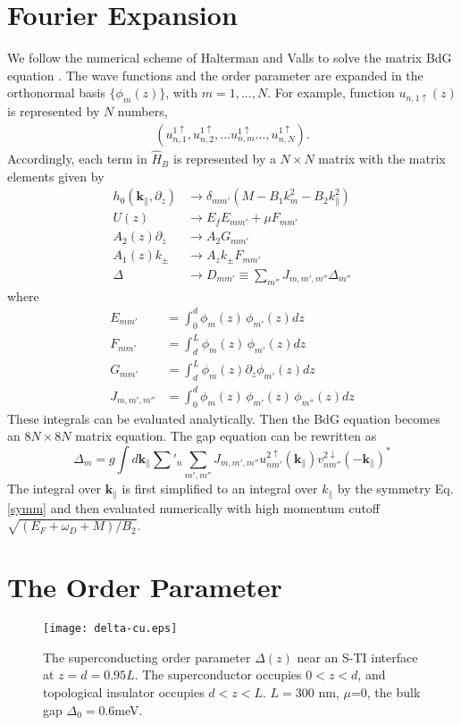 \documentclass[11pt,revtex,aps]{report}
\newcommand{\kperp}{\mathbf{k}_\parallel}
\begin{document}
\section{Fourier Expansion}
We follow the numerical scheme of Halterman and Valls to solve 
the matrix BdG equation \cite{h-v}. The wave functions and the order parameter
are expanded in the orthonormal basis $\{\phi_m(z)\}$, with $m=1,...,N$. For example,
function $u_{n,1\uparrow}(z)$ is represented by $N$ numbers,
\begin{align*}
(u^{1\uparrow}_{n,1},u^{1\uparrow}_{n,2},...u^{1\uparrow}_{n,m}...,u^{1\uparrow}_{n,N}).
\end{align*}
Accordingly, each term in $\hat{H}_{B}$ is represented
by a $N\times N$ matrix with the matrix elements given by
\begin{align*}
h_0(\kperp,\partial_z) &\rightarrow \delta_{mm'}(M - B_1 k_m^2 - B_2 k_\parallel^2) \\
U(z) &\rightarrow E_f E_{mm'} + \mu F_{mm'} \\
 A_2(z) \partial_z &\rightarrow A_2 G_{mm'}\\
 A_1(z) k_\pm &\rightarrow A_z k_\pm F_{mm'} \\
 \Delta &\rightarrow D_{mm'}\equiv \sum_{m''}J_{m,m',m''}\Delta_{m''}
\end{align*}
where 
\begin{align*}
E_{mm'}&=\int_0^{d} \phi_m(z) \, \phi_{m'}(z) dz \\
F_{mm'}&=\int_d^{L} \phi_m(z) \, \phi_{m'}(z) dz \\
G_{mm'}&=\int_d^{L} \phi_m(z) \partial_z \phi_{m'}(z) dz\\
J_{m,m',m''}&=\int_0^{d} \phi_m(z) \, \phi_{m'}(z) \, \phi_{m''}(z) dz
\end{align*}
These integrals can be evaluated analytically. Then the BdG equation becomes
an $8N\times 8N$ matrix equation. The gap equation can be rewritten as
\[
\Delta_{m}=g\int d\kperp \sum'_n \sum_{m',m''} J_{m,m',m''}
u^{2\uparrow}_{nm'}(\kperp)v^{2\downarrow}_{nm''}(-\kperp)^* 
\]
The integral over $\kperp$ is first simplified to an integral over $k_\parallel$
by the symmetry Eq. \eqref{symm} and then evaluated numerically with high 
momentum cutoff 
$\sqrt{(E_F+\omega_D+M)/B_2}$.


\section{The Order Parameter}

\begin{figure}
\center
\texttt{[image: delta-cu.eps]}
\caption{The superconducting order parameter $\Delta(z)$ near an S-TI interface at $
z=d=0.95L$. The superconductor occupies $0<z<d$, and topological insulator occupies $d<z<L$. 
$L=300$ nm, $\mu$=0, the bulk gap $\Delta_0=$0.6meV. }\label{delta-cu}
\end{figure}
\end{document}
